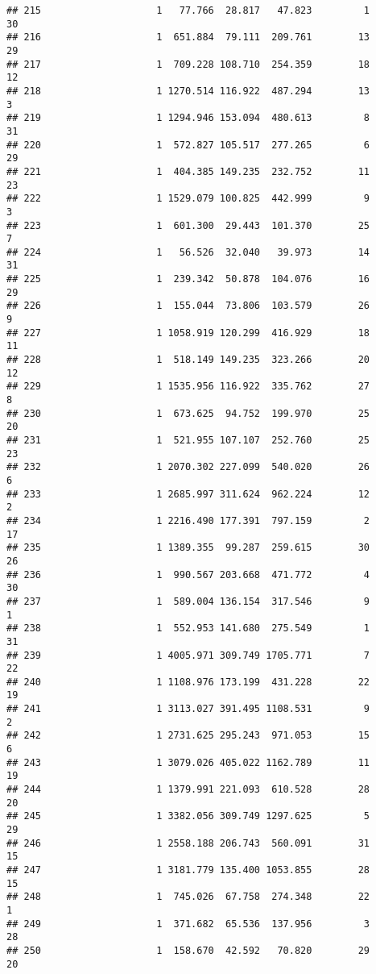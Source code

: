 \documentclass[
]{article}
\begin{document}
\begin{verbatim}
## 215                    1   77.766  28.817   47.823         1        30
## 216                    1  651.884  79.111  209.761        13        29
## 217                    1  709.228 108.710  254.359        18        12
## 218                    1 1270.514 116.922  487.294        13         3
## 219                    1 1294.946 153.094  480.613         8        31
## 220                    1  572.827 105.517  277.265         6        29
## 221                    1  404.385 149.235  232.752        11        23
## 222                    1 1529.079 100.825  442.999         9         3
## 223                    1  601.300  29.443  101.370        25         7
## 224                    1   56.526  32.040   39.973        14        31
## 225                    1  239.342  50.878  104.076        16        29
## 226                    1  155.044  73.806  103.579        26         9
## 227                    1 1058.919 120.299  416.929        18        11
## 228                    1  518.149 149.235  323.266        20        12
## 229                    1 1535.956 116.922  335.762        27         8
## 230                    1  673.625  94.752  199.970        25        20
## 231                    1  521.955 107.107  252.760        25        23
## 232                    1 2070.302 227.099  540.020        26         6
## 233                    1 2685.997 311.624  962.224        12         2
## 234                    1 2216.490 177.391  797.159         2        17
## 235                    1 1389.355  99.287  259.615        30        26
## 236                    1  990.567 203.668  471.772         4        30
## 237                    1  589.004 136.154  317.546         9         1
## 238                    1  552.953 141.680  275.549         1        31
## 239                    1 4005.971 309.749 1705.771         7        22
## 240                    1 1108.976 173.199  431.228        22        19
## 241                    1 3113.027 391.495 1108.531         9         2
## 242                    1 2731.625 295.243  971.053        15         6
## 243                    1 3079.026 405.022 1162.789        11        19
## 244                    1 1379.991 221.093  610.528        28        20
## 245                    1 3382.056 309.749 1297.625         5        29
## 246                    1 2558.188 206.743  560.091        31        15
## 247                    1 3181.779 135.400 1053.855        28        15
## 248                    1  745.026  67.758  274.348        22         1
## 249                    1  371.682  65.536  137.956         3        28
## 250                    1  158.670  42.592   70.820        29        20

\end{verbatim}
\end{document}
